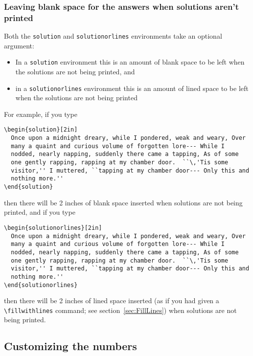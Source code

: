 \documentclass[12pt]{exam}
\begin{document}
\subsubsection{Leaving blank space for the answers when solutions aren't
  printed}
\label{sec:SolSpace}

Both the \verb"solution" and \verb"solutionorlines" environments take
an optional argument:
\begin{itemize}
\item In a \verb"solution" environment this is an amount of blank
  space to be left when the solutions are not being printed, and
\item in a \verb"solutionorlines" environment this is an amount of
  lined space to be left when the solutions are not being printed
\end{itemize}
For example, if you type
\begin{verbatim}
\begin{solution}[2in]
  Once upon a midnight dreary, while I pondered, weak and weary, Over
  many a quaint and curious volume of forgotten lore--- While I
  nodded, nearly napping, suddenly there came a tapping, As of some
  one gently rapping, rapping at my chamber door.  ``\,'Tis some
  visitor,'' I muttered, ``tapping at my chamber door--- Only this and
  nothing more.''
\end{solution}
\end{verbatim}
then there will be 2 inches of blank space inserted when solutions are
not being printed, and if you type
\begin{verbatim}
\begin{solutionorlines}[2in]
  Once upon a midnight dreary, while I pondered, weak and weary, Over
  many a quaint and curious volume of forgotten lore--- While I
  nodded, nearly napping, suddenly there came a tapping, As of some
  one gently rapping, rapping at my chamber door.  ``\,'Tis some
  visitor,'' I muttered, ``tapping at my chamber door--- Only this and
  nothing more.''
\end{solutionorlines}
\end{verbatim}
then there will be 2 inches of lined space inserted (as if you had
given a \verb"\fillwithlines" command; see
section~\ref{sec:FillLines}) when solutions are not being printed.




\subsection{Customizing the numbers}
\label{sec:CustNumb}
\end{document}
